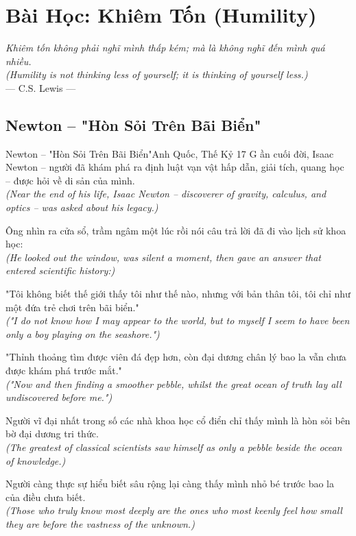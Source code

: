 \chapter{Bài Học: Khiêm Tốn (Humility)}
\begin{center}
  \textit{\color{truyenblue}Khiêm tốn không phải nghĩ mình thấp kém; mà là không nghĩ đến mình quá nhiều.}\\
  \textit{(Humility is not thinking less of yourself; it is thinking of yourself less.)}\\[4pt]
  \small\color{truyengold}--- C.S. Lewis ---
\end{center}
\ngancach

\section{Newton -- "Hòn Sỏi Trên Bãi Biển"}
\begin{truyen}{Newton -- "Hòn Sỏi Trên Bãi Biển"}{Anh Quốc, Thế Kỷ 17}
G ần cuối đời, Isaac Newton -- người đã khám phá ra định luật vạn vật hấp dẫn, giải tích, quang học -- được hỏi về di sản của mình.\\
\textit{(Near the end of his life, Isaac Newton -- discoverer of gravity, calculus, and optics -- was asked about his legacy.)}

Ông nhìn ra cửa sổ, trầm ngâm một lúc rồi nói câu trả lời đã đi vào lịch sử khoa học:\\
\textit{(He looked out the window, was silent a moment, then gave an answer that entered scientific history:)}

"Tôi không biết thế giới thấy tôi như thế nào, nhưng với bản thân tôi, tôi chỉ như một đứa trẻ chơi trên bãi biển."\\
\textit{("I do not know how I may appear to the world, but to myself I seem to have been only a boy playing on the seashore.")}

"Thỉnh thoảng tìm được viên đá đẹp hơn, còn đại dương chân lý bao la vẫn chưa được khám phá trước mắt."\\
\textit{("Now and then finding a smoother pebble, whilst the great ocean of truth lay all undiscovered before me.")}

Người vĩ đại nhất trong số các nhà khoa học cổ điển chỉ thấy mình là hòn sỏi bên bờ đại dương tri thức.\\
\textit{(The greatest of classical scientists saw himself as only a pebble beside the ocean of knowledge.)}

\end{truyen}
\begin{baihoc}
  Người càng thực sự hiểu biết sâu rộng lại càng thấy mình nhỏ bé trước bao la của điều chưa biết.\\
  \textit{(Those who truly know most deeply are the ones who most keenly feel how small they are before the vastness of the unknown.)}
\end{baihoc}

